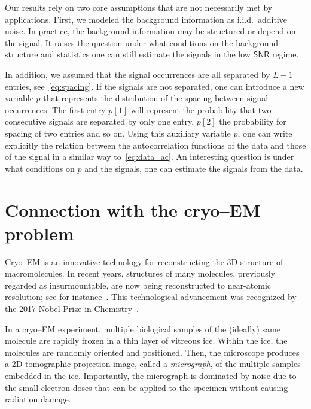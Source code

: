 \documentclass[english,11pt]{article}
\numberwithin{equation}{section}
\theoremstyle{plain}
\theoremstyle{definition}
\theoremstyle{remark}
\theoremstyle{plain}
\theoremstyle{remark}
\theoremstyle{plain}
\theoremstyle{plain}
\newcommand{\SNR}{{\textsf{SNR}}}
\begin{document}
Our results rely on two core assumptions that are not necessarily met by applications. 
First, we modeled the background information as i.i.d.\ additive noise. In practice, the background information may be structured or depend on the signal. It raises the question  under what conditions on the background structure and statistics  
one can still estimate the signals in the low $\SNR$ regime.

In addition, we assumed that the signal occurrences are all separated by $L-1$ entries, see~\eqref{eq:spacing}. If the signals are not separated, one can introduce a new variable $p$ that represents the distribution of the spacing between signal occurrences. The first entry $p[1]$ will represent the probability that two consecutive signals are separated by only one entry, $p[2]$ the probability for spacing of two entries and so on. Using this auxiliary variable $p$, one can write explicitly the relation between the autocorrelation functions of the data and those of the signal in a similar way to~\eqref{eq:data_ac}. 
An interesting question is  under what conditions on $p$ and the signals, one can estimate the signals from the data.


\section{Connection with the cryo--EM problem}	

Cryo--EM is an innovative technology for reconstructing the 3D structure of macromolecules. In recent years, structures
of many molecules, previously regarded as insurmountable, are now being
reconstructed to near-atomic resolution; see for instance~\cite{kuhlbrandt2014resolution,bartesaghi20152}. This technological advancement was recognized by the 2017 Nobel Prize in Chemistry~\cite{nobel}. 

In a cryo--EM experiment, multiple biological samples of the (ideally) same molecule are rapidly frozen in a thin layer of vitreous ice. Within the ice, the molecules are randomly oriented and positioned. Then,  the microscope produces a 2D tomographic projection image, called a \emph{micrograph}, of the multiple samples embedded in the ice. Importantly, the micrograph is dominated by noise due to the small electron doses that
can be applied to the specimen without causing radiation damage.
\end{document}
